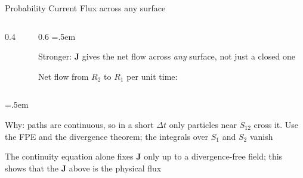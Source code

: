 \documentclass[xcolor={dvipsnames},t]{beamer}
\let\olditemize=\itemize
\let\endolditemize=\enditemize
\renewenvironment{itemize}{\olditemize \itemsep=.5em }{\endolditemize}
\begin{document}
\begin{frame}{Probability Current}
    \alert{Flux across any surface}
    \begin{columns}[T]
        \begin{column}{0.4\textwidth}
            \centering
        \end{column}
        \begin{column}{0.6\textwidth}
            \begin{itemize}
                \item<2-> Stronger: $\bm J$ gives the net flow across \textit{any} surface, not just a closed one
                \item<3-> Net flow from $R_2$ to $R_1$ per unit time:
            \end{itemize}
        \end{column}
    \end{columns}
    \vspace{-1em}
    \begin{itemize}
        \item<4-> Why: paths are continuous, so in a short $\Delta t$ only particles near $S_{12}$ cross it. Use the FPE and the divergence theorem; the integrals over $S_1$ and $S_2$ vanish
        \item<5-> The continuity equation alone fixes $\bm J$ only up to a divergence-free field; this shows that the $\bm J$ above is the physical flux
    \end{itemize}
\end{frame}
\end{document}
